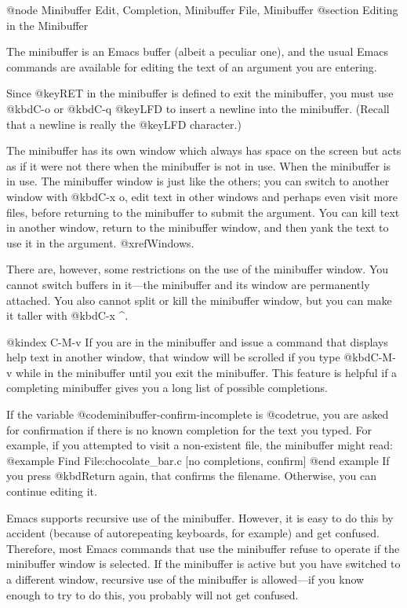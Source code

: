 {{@node Minibuffer Edit, Completion, Minibuffer File, Minibuffer
@section Editing in the Minibuffer

  The minibuffer is an Emacs buffer (albeit a peculiar one), and the usual
Emacs commands are available for editing the text of an argument you are
entering.

  Since @key{RET} in the minibuffer is defined to exit the minibuffer,
you must use @kbd{C-o} or @kbd{C-q @key{LFD}} to insert a newline into
the minibuffer. (Recall that a newline is really the @key{LFD}
character.)

  The minibuffer has its own window which always has space on the screen
but acts as if it were not there when the minibuffer is not in use.
When the minibuffer is in use. The minibuffer window is just like the
others; you can switch to another window with @kbd{C-x o}, edit text in
other windows and perhaps even visit more files, before returning to the
minibuffer to submit the argument.  You can kill text in another window,
return to the minibuffer window, and then yank the text to use it in the
argument.  @xref{Windows}.

  There are, however, some restrictions on the use of the minibuffer window.
You cannot switch buffers in it---the minibuffer and its window are
permanently attached.  You also cannot split or kill the minibuffer
window, but you can make it taller with @kbd{C-x ^}.

@kindex C-M-v
  If you are in the minibuffer and issue a command that displays help
text in another window, that window will be scrolled if you type
@kbd{C-M-v} while in the minibuffer until you exit the minibuffer.  This
feature is helpful if a completing minibuffer gives you a long list of
possible completions.

If the variable @code{minibuffer-confirm-incomplete} is @code{true}, you
are asked for confirmation if there is no known completion for the text
you typed. For example, if you attempted to visit a non-existent file,
the minibuffer might read:
@example
        Find File:chocolate_bar.c [no completions, confirm]
@end example
If you press @kbd{Return} again, that confirms the filename. Otherwise,
you can continue editing it. 

 Emacs supports recursive use of the minibuffer.  However, it is
easy to do this by accident (because of autorepeating keyboards, for
example) and get confused.  Therefore, most Emacs commands that use the
minibuffer refuse to operate if the minibuffer window is selected.  If the
minibuffer is active but you have switched to a different window, recursive
use of the minibuffer is allowed---if you know enough to try to do this,
you probably will not get confused.

}}
